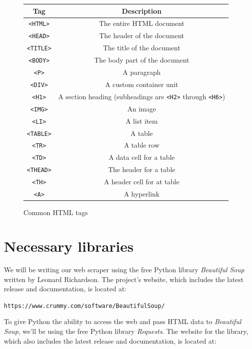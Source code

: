 \documentclass{book}
\begin{document}
\begin{figure}[h]
	\caption{Common HTML tags}
	\centering
	\begin{center}
		\begin{tabular}{|c | c|}
			\hline Tag & Description \\ [0.5ex]
			\hline
			\texttt{<HTML>} & The entire HTML document \\
			\hline
			\texttt{<HEAD>} & The header of the document \\
			\hline
			\texttt{<TITLE>} & The title of the document \\
			\hline
			\texttt{<BODY>} & The body part of the document \\
			\hline
			\texttt{<P>} & A paragraph \\
			\hline
			\texttt{<DIV>} & A custom container unit \\
			\hline
			\texttt{<H1>} & A section heading (subheadings are \texttt{<H2>} through \texttt{<H6>}) \\
			\hline
			\texttt{<IMG>} & An image \\
			\hline
			\texttt{<LI>} & A list item \\
			\hline
			\texttt{<TABLE>} & A table \\
			\hline
			\texttt{<TR>} & A table row \\
			\hline
			\texttt{<TD>} & A data cell for a table \\
			\hline
			\texttt{<THEAD>} & The header for a table \\
			\hline
			\texttt{<TH>} & A header cell for at table \\
			\hline
			\texttt{<A>} & A hyperlink \\
			\hline
		\end{tabular}
	\end{center}
\end{figure}

\section{Necessary libraries}
	
	We will be writing our web scraper using the free Python library \textit{Beautiful Soup} written by Leonard Richardson. The project's website, which includes the latest release and documentation, is located at:
	
	\texttt{https://www.crummy.com/software/BeautifulSoup/}
	
	To give Python the ability to access the web and pass HTML data to \textit{Beautiful Soup}, we'll be using the free Python library \textit{Requests}. The website for the library, which also includes the latest release and documentation, is located at:
	
\end{document}
